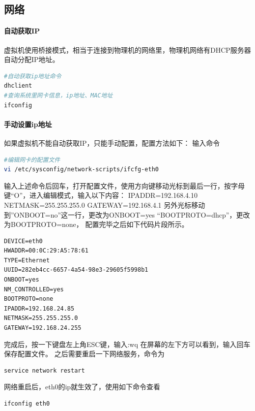 \documentclass{book}
\begin{document}
\subsection{网络}

\paragraph{自动获取IP}
虚拟机使用桥接模式，相当于连接到物理机的网络里，物理机网络有DHCP服务器自动分配IP地址。

\begin{lstlisting}[language=Bash]
#自动获取ip地址命令
dhclient 
#查询系统里网卡信息，ip地址、MAC地址
ifconfig 
\end{lstlisting}

\paragraph{手动设置ip地址}

如果虚拟机不能自动获取IP，只能手动配置，配置方法如下：
输入命令

\begin{lstlisting}[language=Bash]
#编辑网卡的配置文件
vi /etc/sysconfig/network-scripts/ifcfg-eth0
\end{lstlisting}

输入上述命令后回车，打开配置文件，使用方向键移动光标到最后一行，按字母键“O”，进入编辑模式，输入以下内容：
IPADDR=192.168.4.10
NETMASK=255.255.255.0
GATEWAY=192.168.4.1
另外光标移动到”ONBOOT=no”这一行，更改为ONBOOT=yes
“BOOTPROTO=dhcp”，更改为BOOTPROTO=none，
配置完毕之后如下代码片段所示。

\begin{lstlisting}
DEVICE=eth0
HWADDR=00:0C:29:A5:78:61
TYPE=Ethernet
UUID=282eb4cc-6657-4a54-98e3-29605f5998b1
ONBOOT=yes
NM_CONTROLLED=yes
BOOTPROTO=none
IPADDR=192.168.24.85
NETMASK=255.255.255.0
GATEWAY=192.168.24.255
\end{lstlisting}

完成后，按一下键盘左上角ESC键，输入:wq 在屏幕的左下方可以看到，输入回车保存配置文件。
之后需要重启一下网络服务，命令为

\begin{lstlisting}[language=Bash]
service network restart
\end{lstlisting}

网络重启后，eth0的ip就生效了，使用如下命令查看

\begin{lstlisting}[language=Bash]
ifconfig eth0
\end{lstlisting}
 
\end{document}
